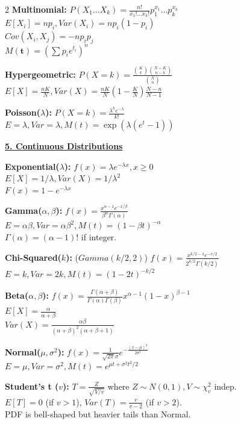 \documentclass{article}
\newcommand{\sectiontitle}[1]{\vspace{0.1cm}\textbf{\underline{#1}}\vspace{0.1cm}}
\newcommand{\distname}[1]{\textbf{#1}}
\begin{document}
\begin{multicols*}{2}
\distname{Multinomial:}
$P(X_1 \dots X_k) = \frac{n!}{x_1! \dots x_k!} p_1^{x_1} \dots p_k^{x_k}$
\\ $E[X_i] = np_i, Var(X_i) = np_i(1-p_i)$
\\ $Cov(X_i, X_j) = -np_i p_j$
\\ $M(\mathbf{t}) = (\sum p_i e^{t_i})^n$

\distname{Hypergeometric:}
$P(X=k) = \frac{\binom{K}{k}\binom{N-K}{n-k}}{\binom{N}{n}}$
\\ $E[X] = \frac{nK}{N}, Var(X) = \frac{nK}{N}(1-\frac{K}{N})\frac{N-n}{N-1}$

\distname{Poisson($\lambda$):}
$P(X=k) = \frac{\lambda^k e^{-\lambda}}{k!}$
\\ $E=\lambda, Var=\lambda, M(t) = \exp(\lambda(e^t-1))$

\sectiontitle{5. Continuous Distributions}

\distname{Exponential($\lambda$):}
$f(x) = \lambda e^{-\lambda x}, x \ge 0$
\\ $E[X] = 1/\lambda, Var(X) = 1/\lambda^2$
\\ $F(x) = 1 - e^{-\lambda x}$

\distname{Gamma($\alpha, \beta$):}
$f(x) = \frac{x^{\alpha-1}e^{-x/\beta}}{\beta^\alpha \Gamma(\alpha)}$
\\ $E=\alpha\beta, Var=\alpha\beta^2, M(t)=(1-\beta t)^{-\alpha}$
\\ $\Gamma(\alpha) = (\alpha-1)!$ if integer.

\distname{Chi-Squared($k$):} ($Gamma(k/2, 2)$)
$f(x) = \frac{x^{k/2-1}e^{-x/2}}{2^{k/2}\Gamma(k/2)}$
\\ $E=k, Var=2k, M(t)=(1-2t)^{-k/2}$

\distname{Beta($\alpha, \beta$):}
$f(x) = \frac{\Gamma(\alpha+\beta)}{\Gamma(\alpha)\Gamma(\beta)} x^{\alpha-1}(1-x)^{\beta-1}$
\\ $E[X] = \frac{\alpha}{\alpha+\beta}$
\\ $Var(X) = \frac{\alpha\beta}{(\alpha+\beta)^2(\alpha+\beta+1)}$

\distname{Normal($\mu, \sigma^2$):}
$f(x) = \frac{1}{\sqrt{2\pi}\sigma} e^{-\frac{(x-\mu)^2}{2\sigma^2}}$
\\ $E=\mu, Var=\sigma^2, M(t) = e^{\mu t + \sigma^2 t^2 / 2}$

\distname{Student's t ($v$):}
$T = \frac{Z}{\sqrt{V/v}}$ where $Z \sim N(0,1), V \sim \chi^2_v$ indep.
\\ $E[T] = 0$ (if $v>1$), $Var(T) = \frac{v}{v-2}$ (if $v>2$).
\\ PDF is bell-shaped but heavier tails than Normal.


\end{multicols*}
\end{document}
